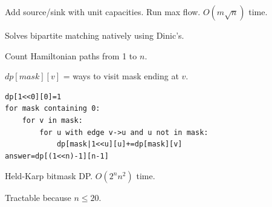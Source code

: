 \Solution Add source/sink with unit capacities. Run max flow. $O(m\sqrt{n})$ time.

\Analysis Solves bipartite matching natively using Dinic's.


\Problem Count Hamiltonian paths from 1 to $n$.

\State $dp[mask][v]$ = ways to visit mask ending at $v$.
\begin{lstlisting}
dp[1<<0][0]=1
for mask containing 0:
    for v in mask:
        for u with edge v->u and u not in mask:
            dp[mask|1<<u][u]+=dp[mask][v]
answer=dp[(1<<n)-1][n-1]
\end{lstlisting}

\Solution Held-Karp bitmask DP. $O(2^n n^2)$ time.

\Analysis Tractable because $n \le 20$.
